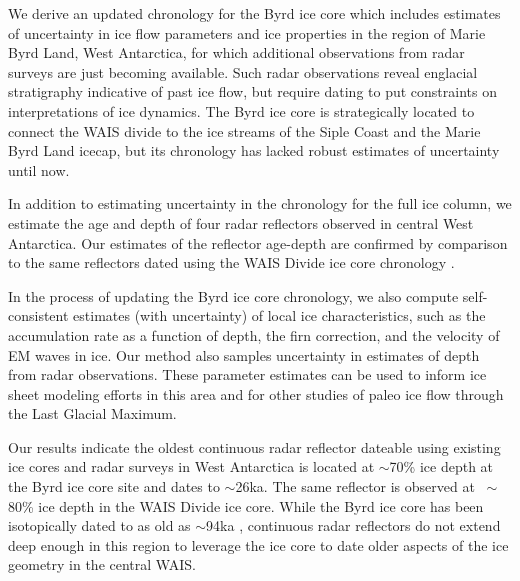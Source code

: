 

We derive an updated chronology for the Byrd ice core which includes estimates of uncertainty in ice flow parameters and ice properties in the region of Marie Byrd Land, West Antarctica, for which additional observations from radar surveys are just becoming available. Such radar observations reveal englacial stratigraphy indicative of past ice flow, but require dating to put constraints on interpretations of ice dynamics. The Byrd ice core is strategically located to connect the WAIS divide to the ice streams of the Siple Coast and the Marie Byrd Land icecap, but its chronology has lacked robust estimates of uncertainty until now. 

In addition to estimating uncertainty in the chronology for the full ice column, we estimate the age and depth of four radar reflectors observed in central West Antarctica. Our estimates of the reflector age-depth are confirmed by comparison to the same reflectors dated using the WAIS Divide ice core chronology \citep{buizert2015}. 

In the process of updating the Byrd ice core chronology, we also compute self-consistent estimates (with uncertainty) of local ice characteristics, such as the accumulation rate as a function of depth, the firn correction, and the velocity of EM waves in ice. Our method also samples uncertainty in estimates of depth from radar observations. These parameter estimates can be used to inform ice sheet modeling efforts in this area and for other studies of paleo ice flow through the Last Glacial Maximum. 

Our results indicate the oldest continuous radar reflector dateable using existing ice cores and radar surveys in West Antarctica is located at $\sim$70\% ice depth at the Byrd ice core site and dates to $\sim$26ka. The same reflector is observed at $~\sim$80\% ice depth in the WAIS Divide ice core. While the Byrd ice core has been isotopically dated to as old as $\sim$94ka \citep{blunier2001}, continuous radar reflectors do not extend deep enough in this region to leverage the ice core to date older aspects of the ice geometry in the central WAIS.




